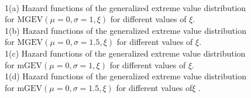 \documentclass[smallextended]{svjour3}       %
\begin{document}
{\begin{figure}[!p]
{}
\caption{\\1(a) Hazard functions of the generalized extreme value distribution for $\mbox{MGEV}(\mu=0,\sigma=1,\xi)$ for different values of $\xi$.\\ 1(b) Hazard functions of the generalized extreme value distribution for $\mbox{MGEV}(\mu=0,\sigma=1.5,\xi)$ for different values of $\xi$.\\1(c) Hazard functions of the generalized extreme value distribution for $\mbox{mGEV}(\mu=0,\sigma=1,\xi)$ for different values of $\xi$.\\ 1(d) Hazard functions of the generalized extreme value distribution for $\mbox{mGEV}(\mu=0,\sigma=1.5,\xi)$ for different values of$\xi$ .}
\label{fig:test}
\end{figure}


}
\end{document}
